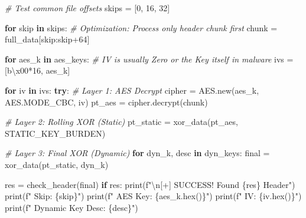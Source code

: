 \documentclass[
]{article}
\newenvironment{Shaded}{}{}
\newcommand{\BuiltInTok}[1]{\textcolor[rgb]{0.00,0.50,0.00}{#1}}
\newcommand{\CharTok}[1]{\textcolor[rgb]{0.25,0.44,0.63}{#1}}
\newcommand{\CommentTok}[1]{\textcolor[rgb]{0.38,0.63,0.69}{\textit{#1}}}
\newcommand{\ControlFlowTok}[1]{\textcolor[rgb]{0.00,0.44,0.13}{\textbf{#1}}}
\newcommand{\DecValTok}[1]{\textcolor[rgb]{0.25,0.63,0.44}{#1}}
\newcommand{\KeywordTok}[1]{\textcolor[rgb]{0.00,0.44,0.13}{\textbf{#1}}}
\newcommand{\NormalTok}[1]{#1}
\newcommand{\OperatorTok}[1]{\textcolor[rgb]{0.40,0.40,0.40}{#1}}
\newcommand{\SpecialCharTok}[1]{\textcolor[rgb]{0.25,0.44,0.63}{#1}}
\newcommand{\SpecialStringTok}[1]{\textcolor[rgb]{0.73,0.40,0.53}{#1}}
\newcommand{\StringTok}[1]{\textcolor[rgb]{0.25,0.44,0.63}{#1}}
\begin{document}
\begin{Shaded}
\begin{Highlighting}[]
    \CommentTok{\# Test common file offsets}
\NormalTok{    skips }\OperatorTok{=}\NormalTok{ [}\DecValTok{0}\NormalTok{, }\DecValTok{16}\NormalTok{, }\DecValTok{32}\NormalTok{]}
    
    \ControlFlowTok{for}\NormalTok{ skip }\KeywordTok{in}\NormalTok{ skips:}
        \CommentTok{\# Optimization: Process only header chunk first}
\NormalTok{        chunk }\OperatorTok{=}\NormalTok{ full\_data[skip:skip}\OperatorTok{+}\DecValTok{64}\NormalTok{]}
        
        \ControlFlowTok{for}\NormalTok{ aes\_k }\KeywordTok{in}\NormalTok{ aes\_keys:}
            \CommentTok{\# IV is usually Zero or the Key itself in malware}
\NormalTok{            ivs }\OperatorTok{=}\NormalTok{ [}\StringTok{b\textquotesingle{}}\CharTok{\textbackslash{}x00}\StringTok{\textquotesingle{}}\OperatorTok{*}\DecValTok{16}\NormalTok{, aes\_k]}
            
            \ControlFlowTok{for}\NormalTok{ iv }\KeywordTok{in}\NormalTok{ ivs:}
                \ControlFlowTok{try}\NormalTok{:}
                    \CommentTok{\# Layer 1: AES Decrypt}
\NormalTok{                    cipher }\OperatorTok{=}\NormalTok{ AES.new(aes\_k, AES.MODE\_CBC, iv)}
\NormalTok{                    pt\_aes }\OperatorTok{=}\NormalTok{ cipher.decrypt(chunk)}
                    
                    \CommentTok{\# Layer 2: Rolling XOR (Static)}
\NormalTok{                    pt\_static }\OperatorTok{=}\NormalTok{ xor\_data(pt\_aes, STATIC\_KEY\_BURDEN)}
                    
                    \CommentTok{\# Layer 3: Final XOR (Dynamic)}
                    \ControlFlowTok{for}\NormalTok{ dyn\_k, desc }\KeywordTok{in}\NormalTok{ dyn\_keys:}
\NormalTok{                        final }\OperatorTok{=}\NormalTok{ xor\_data(pt\_static, dyn\_k)}
                        
\NormalTok{                        res }\OperatorTok{=}\NormalTok{ check\_header(final)}
                        \ControlFlowTok{if}\NormalTok{ res:}
                            \BuiltInTok{print}\NormalTok{(}\SpecialStringTok{f"}\CharTok{\textbackslash{}n}\SpecialStringTok{[+] SUCCESS! Found }\SpecialCharTok{\{}\NormalTok{res}\SpecialCharTok{\}}\SpecialStringTok{ Header"}\NormalTok{)}
                            \BuiltInTok{print}\NormalTok{(}\SpecialStringTok{f"    Skip: }\SpecialCharTok{\{}\NormalTok{skip}\SpecialCharTok{\}}\SpecialStringTok{"}\NormalTok{)}
                            \BuiltInTok{print}\NormalTok{(}\SpecialStringTok{f"    AES Key: }\SpecialCharTok{\{}\NormalTok{aes\_k}\SpecialCharTok{.}\BuiltInTok{hex}\NormalTok{()}\SpecialCharTok{\}}\SpecialStringTok{"}\NormalTok{)}
                            \BuiltInTok{print}\NormalTok{(}\SpecialStringTok{f"    IV: }\SpecialCharTok{\{}\NormalTok{iv}\SpecialCharTok{.}\BuiltInTok{hex}\NormalTok{()}\SpecialCharTok{\}}\SpecialStringTok{"}\NormalTok{)}
                            \BuiltInTok{print}\NormalTok{(}\SpecialStringTok{f"    Dynamic Key Desc: }\SpecialCharTok{\{}\NormalTok{desc}\SpecialCharTok{\}}\SpecialStringTok{"}\NormalTok{)}
                            

\end{Highlighting}
\end{Shaded}
\end{document}
